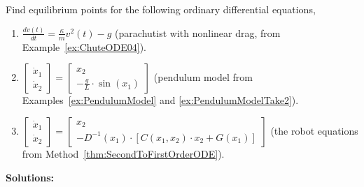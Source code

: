 \begin{example} 
\label{ex:equilibriumPoints}
Find equilibrium points for the following ordinary differential equations,  
 \begin{enumerate}
\renewcommand{\labelenumi}{(\alph{enumi})}
\setlength{\itemsep}{.2cm}
    \item $\frac{dv(t)}{dt} =   \frac{\kappa}{m} v^2(t) - g$ (parachutist with nonlinear drag, from Example~\ref{ex:ChuteODE04}).
    \item $\left[ \begin{array}{c} \dot{x}_1 \\ \dot{x}_2 \end{array} \right]= \left[\begin{array}{c} x_2 \\  -\frac{g}{L}  \cdot \sin(x_1)\end{array} \right]$ (pendulum model from Examples~\ref{ex:PendulumModel} and \ref{ex:PendulumModelTake2}).
    \item $ \left[ \begin{array}{c} \dot{x}_1 \\ \dot{x}_2 \end{array} \right] = \left[\begin{array}{c} x_2 \\-D^{-1}(x_1) \cdot \left[ C(x_1, x_2) \cdot x_2 + G(x_1)\right] \end{array} \right] $ (the robot equations from Method~\ref{thm:SecondToFirstOrderODE}).
\end{enumerate} 
\end{example}
\textbf{Solutions:}
